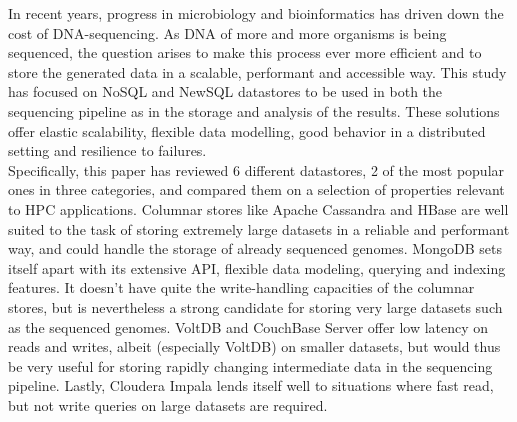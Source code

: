 \documentclass{IEEEtran}
\begin{document}
In recent years, progress in microbiology and bioinformatics has driven down the cost of DNA-sequencing. As DNA of more and more organisms is being sequenced, the question arises to make this process ever more efficient and to store the generated data in a scalable, performant and accessible way. This study has focused on NoSQL and NewSQL datastores to be used in both the sequencing pipeline as in the storage and analysis of the results. These solutions offer elastic scalability, flexible data modelling, good behavior in a distributed setting and resilience to failures.\\
Specifically, this paper has reviewed 6 different datastores, 2 of the most popular ones in three categories, and compared them on a selection of properties relevant to HPC applications. Columnar stores like Apache Cassandra and HBase are well suited to the task of storing extremely large datasets in a reliable and performant way, and could handle the storage of already sequenced genomes. MongoDB sets itself apart with its extensive API, flexible data modeling, querying and indexing features. It doesn't have quite the write-handling capacities of the columnar stores, but is nevertheless a strong candidate for storing very large datasets such as the sequenced genomes. VoltDB and CouchBase Server offer low latency on reads and writes, albeit (especially VoltDB) on smaller datasets, but would thus be very useful for storing rapidly changing intermediate data in the sequencing pipeline. Lastly, Cloudera Impala lends itself well to situations where fast read, but not write queries on large datasets are required.

{}

\end{document}
